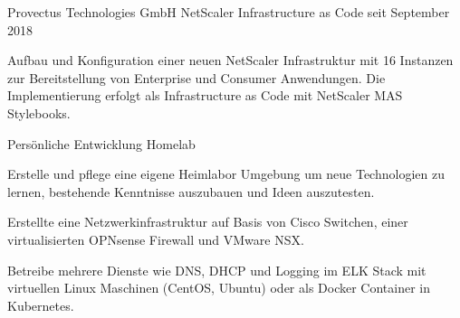 


\begin{cventries}


\cventry
{Provectus Technologies GmbH} %
{NetScaler Infrastructure as Code} %
{} %
{seit September 2018} %
{ %
\begin{cvitems}
\item {Aufbau und Konfiguration einer neuen NetScaler Infrastruktur mit 16 Instanzen zur Bereitstellung von Enterprise und Consumer Anwendungen. Die Implementierung erfolgt als Infrastructure as Code mit NetScaler MAS Stylebooks.}
\end{cvitems}
}

\cventry
{Persönliche Entwicklung} %
{Homelab} %
{} %
{} %
{ %
{Erstelle und pflege eine eigene Heimlabor Umgebung um neue Technologien zu lernen, bestehende Kenntnisse auszubauen und Ideen auszutesten.}
\begin{cvitems}
\item {}
\item {Erstellte eine Netzwerkinfrastruktur auf Basis von Cisco Switchen, einer virtualisierten OPNsense Firewall und VMware NSX.}
\item {Betreibe mehrere Dienste wie DNS, DHCP und Logging im ELK Stack mit virtuellen Linux Maschinen (CentOS, Ubuntu) oder als Docker Container in Kubernetes. }
\end{cvitems}
}



\end{cventries}
